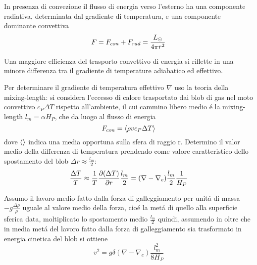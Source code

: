 \begin{wordonframe}{}

In presenza di convezione il flusso di energia verso l'esterno ha una componente radiativa, determinata dal gradiente di temperatura, e una componente dominante convettiva 
\begin{equation*}\label{eq:radconvflux}
F=F_{con}+F_{rad}=\frac{\lsun{}}{4\pi r^2}
\end{equation*}

Una maggiore efficienza del trasporto convettivo di energia si riflette in una minore differenza tra il gradiente di temperature adiabatico ed effettivo.

\begin{figure}[!h]

\end{figure}

Per determinare il gradiente di temperatura effettivo $\nabla$ uso la teoria della mixing-length:
si considera l'eccesso di calore trasportato dai blob di gas nel moto convettivo $c_P\Delta T$ rispetto all'ambiente, il cui cammino libero medio \'e la mixing-length $l_m=\alpha H_P$, che da luogo al flusso di energia
\begin{equation*}
F_{con}=\exv{\rho vc_P\Delta T}\label{eq:convectiveflux}
\end{equation*}
dove $\exv{}$ indica una media opportuna sulla sfera di raggio r. Determino il valor medio della differenza di temperatura prendendo come valore caratteristico dello spostamento del blob $\Delta r\approx\frac{l_m}{2}$:
\begin{equation*}
\frac{\Delta T}{T}\approx\frac{1}{T}\PDy{r}{(\Delta T)}\frac{l_m}{2}=(\nabla-\nabla_e)\frac{l_m}{2}\frac{1}{H_P}\label{eq:blobambdiff}
\end{equation*}

Assumo il lavoro medio fatto dalla forza di galleggiamento per unit\'a di massa $-g\frac{\Delta\rho}{\rho}$ uguale al valore medio della forza, cio\'e la met\'a di quello alla superficie sferica data, moltiplicato lo spostamento medio $\frac{l_m}{2}$ quindi, assumendo in oltre che in media met\'a del lavoro fatto dalla forza di galleggiamento sia trasformato in energia cinetica del blob si ottiene
\begin{equation*}
v^2=g\delta(\nabla-\nabla_e)\frac{l_m^2}{8H_P}\label{eq:blobvelocity}
\end{equation*}


\end{wordonframe}
